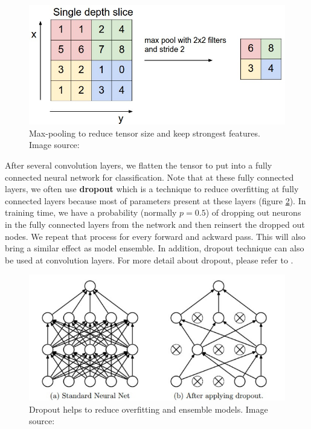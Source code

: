 \begin{figure}[tb]
	\centering
	\includegraphics[width=0.6\hsize]{./figures/maxpool}
	\caption{Max-pooling to reduce tensor size and keep strongest features. Image source: \cite{cs231n}}
	\label{fig:maxpool}
\end{figure}

After several convolution layers, we flatten the tensor to put into a fully connected neural network for classification. Note that at these fully connected layers, we often use \textbf{dropout} which is a technique to reduce overfitting at fully connected layers because most of parameters present at these layers (figure \ref{fig:dropout}). In training time, we have a probability (normally $p=0.5$) of dropping out neurons in the fully connected layers from the network and then reinsert the dropped out nodes. We repeat that process for every forward and ackward pass. This will also bring a similar effect as model ensemble. In addition, dropout technique can also be used at convolution layers. For more detail about dropout, please refer to \cite{Srivastava:2014:DSW:2627435.2670313}.
\begin{figure}[tb]
	\centering
	\includegraphics[width=0.8\hsize]{./figures/dropout}
	\caption{Dropout helps to reduce overfitting and ensemble models. Image source: \cite{Srivastava:2014:DSW:2627435.2670313}}
	\label{fig:dropout}
\end{figure}


